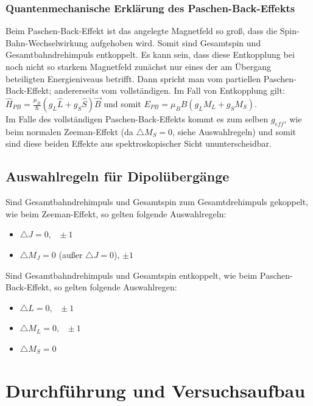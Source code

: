 \documentclass[bigchapter,colorback,accentcolor=tud4b,linedtoc,11pt]{tudreport}
\begin{document}
\subsection{Quantenmechanische Erklärung des Paschen-Back-Effekts}

Beim Paschen-Back-Effekt ist das angelegte Magnetfeld so groß, dass
die Spin-Bahn-Wechselwirkung aufgehoben wird. Somit sind Gesamtspin
und Gesamtbahndrehimpuls entkoppelt. Es kann sein, dass diese Entkopplung
bei noch nicht so starkem Magnetfeld zunächst nur eines der am Übergang
beteiligten Energieniveaus betrifft. Dann spricht man vom partiellen
Paschen-Back-Effekt; andererseits vom vollständigen. Im Fall von Entkopplung
gilt: $\hat{H}_{PB}=\frac{\mu_{B}}{\hslash}(g_{L}\hat{L}+g_{S}\hat{S})\vec{B}$
und somit $E_{PB}=\mu_{B}B(g_{L}M_{L}+g_{S}M_{S})$.\\
Im Falle des vollständigen Paschen-Back-Effekts kommt es zum selben
$g_{eff}$, wie beim normalen Zeeman-Effekt (da $\triangle M_{S}=0$,
siehe Auswahlregeln) und somit sind diese beiden Effekte aus spektroskopischer
Sicht ununterscheidbar. 


\section{Auswahlregeln für Dipolübergänge}

Sind Gesamtbahndrehimpuls und Gesamtspin zum Gesamtdrehimpuls gekoppelt,
wie beim Zeeman-Effekt, so gelten folgende Auswahlregeln:
\begin{itemize}
\item $\triangle J=0,\mbox{ }\pm1$
\item $\triangle M_{J}=0$ (außer $\triangle J=\text{0}$), $\pm1$
\end{itemize}
Sind Gesamtbahndrehimpuls und Gesamtspin entkoppelt, wie beim Paschen-Back-Effekt,
so gelten folgende Auswahlregen:
\begin{itemize}
\item $\triangle L=0,\mbox{ }\pm1$
\item $\triangle M_{L}=0,\mbox{ }\pm1$
\item $\triangle M_{S}=0$\end{itemize}

\chapter{Durchführung und Versuchsaufbau}
\end{document}
